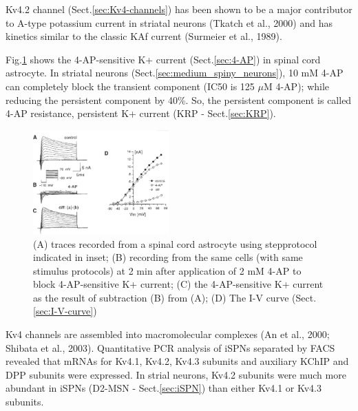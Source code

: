 Kv4.2 channel (Sect.\ref{sec:Kv4-channels}) has been shown to be a major
contributor to A-type potassium current in striatal neurons (Tkatch et al.,
2000) and has kinetics similar to the classic KAf current (Surmeier et al.,
1989).

Fig.\ref{fig:4-AP_Kcurrent} shows the 4-AP-sensitive K+ current
(Sect.\ref{sec:4-AP}) in spinal cord astrocyte.
In striatal neurons (Sect.\ref{sec:medium_spiny_neurons}), 10 mM 4-AP can
completely block the transient component (IC50 is 125 $\mu$M 4-AP); while
reducing the persistent component by 40\%. So, the persistent component is
called 4-AP resistance, persistent K+ current (KRP - Sect.\ref{sec:KRP}).
 
% 
%   


\begin{figure}[hbt]
  \centerline{\includegraphics[height=4cm,
    angle=0]{./images/4-AP_Kcurrent.eps}}
\caption{(A) traces recorded from a spinal cord astrocyte using stepprotocol
indicated in inset; (B) recording from the same cells (with same
stimulus protocols) at 2 min after application of 2 mM 4-AP to block
4-AP-sensitive K+ current; (C) the 4-AP-sensitive K+ current as the result of
subtraction (B) from (A); (D) The I-V curve (Sect.\ref{sec:I-V-curve})}
\label{fig:4-AP_Kcurrent}
\end{figure}


Kv4 channels are assembled into macromolecular complexes (An et al., 2000;
Shibata et al., 2003). Quantitative PCR analysis of iSPNs separated by FACS
revealed that mRNAs for Kv4.1, Kv4.2, Kv4.3 subunits and auxiliary KChIP and DPP
subunits were expressed. In strial neurons, Kv4.2 subunits were much more
abundant in iSPNs (D2-MSN - Sect.\ref{sec:iSPN}) than either Kv4.1 or Kv4.3
subunits.

